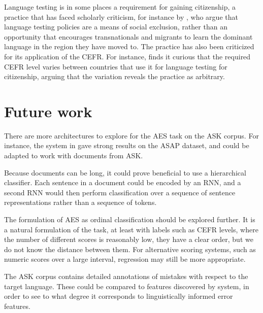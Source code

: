 Language testing is in some places a requirement for gaining citizenship, a
practice that has faced scholarly criticism, for instance by
\textcite[162]{weberhorner}, who argue that language testing policies are a
means of social exclusion, rather than an opportunity that encourages
transnationals and migrants to learn the dominant language in the region they
have moved to. The practice has also been criticized for its application of
the \ac{CEFR}. For instance, \textcite{van2009fortress} finds it curious that
the required CEFR level varies between countries that use it for language
testing for citizenship, arguing that the variation reveals the practice as
arbitrary.


\section{Future work}

There are more architectures to explore for the \ac{AES} task on the ASK
corpus. For instance, the system in \textcite{alikaniotis2016automatic} gave
strong results on the ASAP dataset, and could be adapted to work with
documents from ASK.

Because documents can be long, it could prove beneficial to use a
hierarchical classifier. Each sentence in a document could be encoded by an
RNN, and a second RNN would then perform classification over a sequence of
sentence representations rather than a sequence of tokens.

The formulation of \ac{AES} as ordinal classification should be explored
further. It is a natural formulation of the task, at least with labels such
as \ac{CEFR} levels, where the number of different scores is reasonably low,
they have a clear order, but we do not know the distance between them. For
alternative scoring systems, such as numeric scores over a large interval,
regression may still be more appropriate.

The ASK corpus contains detailed annotations of mistakes with respect to the
target language. These could be compared to features discovered by 
system, in order to see to what degree it corresponds to linguistically
informed error features.
